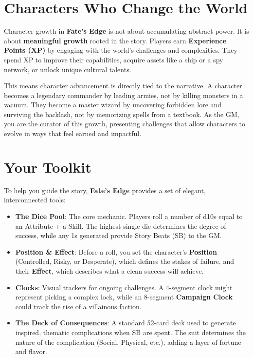 \section*{Characters Who Change the World}

Character growth in \textbf{Fate's Edge} is not about accumulating abstract power. It is about \textbf{meaningful growth} rooted in the story. Players earn \textbf{Experience Points (XP)} by engaging with the world's challenges and complexities. They spend XP to improve their capabilities, acquire assets like a ship or a spy network, or unlock unique cultural talents.

This means character advancement is directly tied to the narrative. A character becomes a legendary commander by leading armies, not by killing monsters in a vacuum. They become a master wizard by uncovering forbidden lore and surviving the backlash, not by memorizing spells from a textbook. As the GM, you are the curator of this growth, presenting challenges that allow characters to evolve in ways that feel earned and impactful.

\section*{Your Toolkit}

To help you guide the story, \textbf{Fate's Edge} provides a set of elegant, interconnected tools:

\begin{itemize}
    \item \textbf{The Dice Pool}: The core mechanic. Players roll a number of d10s equal to an Attribute + a Skill. The highest single die determines the degree of success, while any 1s generated provide Story Beats (SB) to the GM.
    \item \textbf{Position & Effect}: Before a roll, you set the character's \textbf{Position} (Controlled, Risky, or Desperate), which defines the stakes of failure, and their \textbf{Effect}, which describes what a clean success will achieve.
    \item \textbf{Clocks}: Visual trackers for ongoing challenges. A 4-segment clock might represent picking a complex lock, while an 8-segment \textbf{Campaign Clock} could track the rise of a villainous faction.
    \item \textbf{The Deck of Consequences}: A standard 52-card deck used to generate inspired, thematic complications when SB are spent. The suit determines the nature of the complication (Social, Physical, etc.), adding a layer of fortune and flavor.
\end{itemize}

